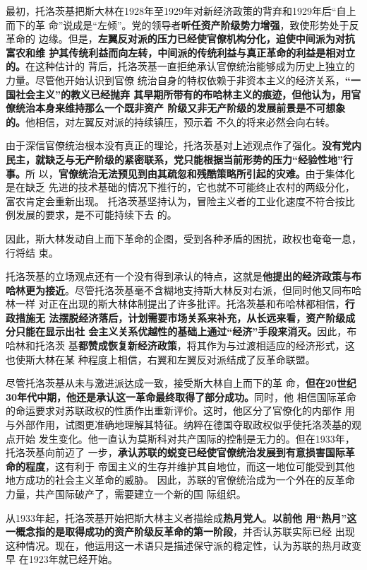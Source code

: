 最初，托洛茨基把斯大林在1928年至1929年对新经济政策的背弃和1929年后“自上而下的革
命”说成是“左倾”。党的领导者\textbf{听任资产阶级势力增强}，致使形势处于反革命的
边缘。但是，\textbf{左翼反对派的压力已经使官僚机构分化，迫使中间派为对抗富农和维
  护其传统利益而向左转，中间派的传统利益与真正革命的利益是相对立的。}在这种估计的
背后，托洛茨基一直拒绝承认官僚统治能够成为历史上独立的力量。尽管他开始认识到官僚
统治自身的特权依赖于非资本主义的经济关系，\textbf{“一国社会主义”的教义已经抛弃
  其早期所带有的布哈林主义的痕迹，但他认为，用官僚统治本身来维持那么一个既非资产
  阶级又非无产阶级的发展前景是不可想象的。}他相信，对左翼反对派的持续镇压，预示着
不久的将来必然会向右转。

由于深信官僚统治根本没有真正的理论，托洛茨基对上述观点作了强化。\textbf{没有党内
  民主，就缺乏与无产阶级的紧密联系，党只能根据当前形势的压力“经验性地”行事。}所
以，\textbf{官僚统治无法预见到由其疏忽和残酷策略所引起的灾难。}由于集体化是在缺乏
先进的技术基础的情况下推行的，它也就不可能终止农村的两级分化，富农肯定会重新出现。
托洛茨基坚持认为，冒险主义者的工业化速度不符合按比例发展的要求，是不可能持续下去
的。

因此，斯大林发动自上而下革命的企图，受到各种矛盾的困扰，政权也奄奄一息，行将结
束。

托洛茨基的立场观点还有一个没有得到承认的特点，这就是\textbf{他提出的经济政策与布
  哈林更为接近}。尽管托洛茨基毫不含糊地支持斯大林反对右派，但同时他又同布哈林一样
对正在出现的斯大林体制提出了许多批评。托洛茨基和布哈林都相信，\textbf{行政措施无
  法摆脱经济落后，计划需要市场关系来补充，从长远来看，资产阶级成分只能在显示出社
  会主义关系优越性的基础上通过“经济”手段来消灭。}因此，布哈林和托洛茨
基\textbf{都赞成恢复新经济政策}，将其作为与过渡相适应的经济形式，这也使斯大林在某
种程度上相信，右翼和左翼反对派结成了反革命联盟。

尽管托洛茨基从未与激进派达成一致，接受斯大林自上而下的革
命，\textbf{但在20世纪30年代中期，他还是承认这一革命最终取得了部分成功。}同时，他
相信国际革命的命运要求对苏联政权的性质作出重新评价。这时，他区分了官僚化的内部作
用与外部作用，试图更准确地理解其特征。纳粹在德国夺取政权似乎使托洛茨基的观点开始
发生变化。他一直认为莫斯科对共产国际的控制是无力的。但在1933年，托洛茨基向前迈了
一步，\textbf{承认苏联的蜕变已经使官僚统治发展到有意损害国际革命的程度}，这有利于
帝国主义的生存并维护其自地位，而这一地位可能受到其他地方成功的社会主义革命的威胁。
因此，苏联的官僚统治成为一个外在的反革命力量，共产国际破产了，需要建立一个新的国
际组织。

从1933年起，托洛茨基开始把斯大林主义者描绘成\textbf{热月党人}。\textbf{以前他
  用“热月”这一概念指的是取得成功的资产阶级反革命的第一阶段}，并否认苏联实际已经
出现这种情况。现在，他运用这一术语只是描述保守派的稳定性，认为苏联的热月政变早
在1923年就已经开始。

